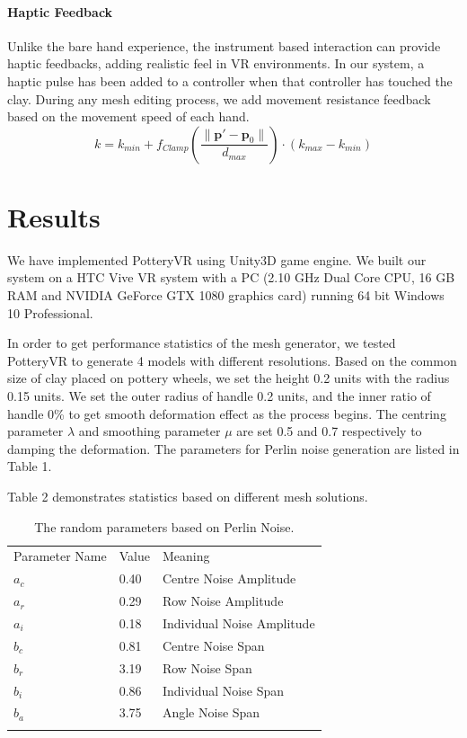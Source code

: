 \paragraph{Haptic Feedback}
Unlike the bare hand experience, the instrument based interaction can provide haptic feedbacks, adding realistic feel in VR environments. In our system, a haptic pulse has been added to a controller when that controller has touched the clay. During any mesh editing process, we add movement resistance feedback based on the movement speed of each hand.
\begin{equation}
k = k_{min} + f_{Clamp}(\frac{ \| \mathbf{p'} - \mathbf{p}_{0} \|}{d_{max}}) \cdot (k_{max} - k_{min})
\end{equation}


\section{Results}
\label{sec:5}
We have implemented PotteryVR using Unity3D\cite{website:unity} game engine. We built our system on a HTC Vive\cite{website:vive} VR system with a PC (2.10 GHz Dual Core CPU, 16 GB RAM and NVIDIA GeForce GTX 1080 graphics card) running 64 bit Windows 10 Professional.

In order to get performance statistics of the mesh generator, we tested PotteryVR to generate 4 models with different resolutions.
Based on the common size of clay placed on pottery wheels, we set the height 0.2 units with the radius 0.15 units.
We set the outer radius of handle 0.2 units, and the inner ratio of handle 0\% to get smooth deformation effect as the process begins. The centring parameter $\lambda$ and smoothing parameter $\mu$ are set 0.5 and 0.7 respectively to damping the deformation. The parameters for Perlin noise generation are listed in Table 1.

Table 2 demonstrates statistics based on different mesh solutions. 

\begin{table}
\caption{The random parameters based on Perlin Noise.}
\label{tab:1}       %
\begin{tabular}{lll}
\hline\noalign{\smallskip}
Parameter Name & Value & Meaning  \\
\noalign{\smallskip}\hline\noalign{\smallskip}
$a_{c}$ & 0.40 & Centre Noise Amplitude \\
$a_{r}$ & 0.29 & Row Noise Amplitude \\
$a_{i}$ & 0.18 & Individual Noise Amplitude \\
$b_{c}$ & 0.81 & Centre Noise Span \\
$b_{r}$ & 3.19 & Row Noise Span \\
$b_{i}$ & 0.86 & Individual Noise Span \\
$b_{a}$ & 3.75 & Angle Noise Span \\
\noalign{\smallskip}\hline
\end{tabular}
\end{table}


